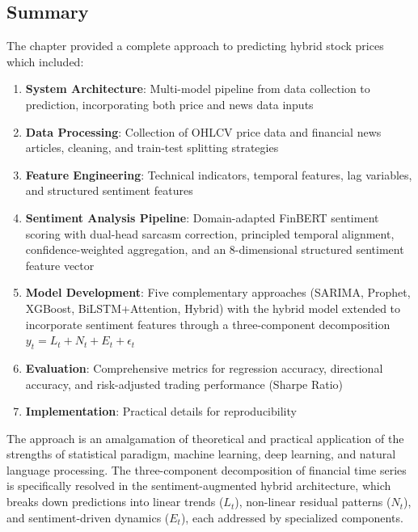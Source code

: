 \subsection{Summary}

The chapter provided a complete approach to predicting hybrid stock prices which included:

\begin{enumerate}
    \item \textbf{System Architecture}: Multi-model pipeline from data collection to prediction, incorporating both price and news data inputs
    \item \textbf{Data Processing}: Collection of OHLCV price data and financial news articles, cleaning, and train-test splitting strategies
    \item \textbf{Feature Engineering}: Technical indicators, temporal features, lag variables, and structured sentiment features
    \item \textbf{Sentiment Analysis Pipeline}: Domain-adapted FinBERT sentiment scoring with dual-head sarcasm correction, principled temporal alignment, confidence-weighted aggregation, and an 8-dimensional structured sentiment feature vector
    \item \textbf{Model Development}: Five complementary approaches (SARIMA, Prophet, XGBoost, BiLSTM+Attention, Hybrid) with the hybrid model extended to incorporate sentiment features through a three-component decomposition $y_t = L_t + N_t + E_t + \epsilon_t$
    \item \textbf{Evaluation}: Comprehensive metrics for regression accuracy, directional accuracy, and risk-adjusted trading performance (Sharpe Ratio)
    \item \textbf{Implementation}: Practical details for reproducibility
\end{enumerate}

The approach is an amalgamation of theoretical and practical application of the strengths of statistical paradigm, machine learning, deep learning, and natural language processing. The three-component decomposition of financial time series is specifically resolved in the sentiment-augmented hybrid architecture, which breaks down predictions into linear trends ($L_t$), non-linear residual patterns ($N_t$), and sentiment-driven dynamics ($E_t$), each addressed by specialized components.

\newpage
\clearpage

